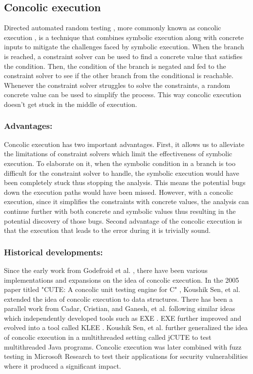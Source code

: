 \documentclass[ runningheads,
               a4paper]{llncs}
\begin{document}
\subsection{Concolic execution}
Directed automated random testing \cite[DART]{godefroid2005dart}, more commonly known as concolic execution \cite{sen2007concolic}, is a technique that combines symbolic execution along with concrete inputs to mitigate the challenges faced by symbolic execution. When the branch is reached, a constraint solver can be used to find a concrete value that satisfies the condition. Then, the condition of the branch is negated and fed to the constraint solver to see if the other branch from the conditional is reachable. Whenever the constraint solver struggles to solve the constraints, a random concrete value can be used to simplify the process. This way concolic execution doesn't get stuck in the middle of execution.


\subsubsection{Advantages:}
Concolic execution has two important advantages. First, it allows us to alleviate the limitations of constraint solvers which limit the effectiveness of symbolic execution. To elaborate on it, when the symbolic condition in a branch is too difficult for the constraint solver to handle, the symbolic execution would have been completely stuck thus stopping the analysis. This means the potential bugs down the execution paths would have been missed. However, with a concolic execution, since it simplifies the constraints with concrete values, the analysis can continue further with both concrete and symbolic values thus resulting in the potential discovery of those bugs. Second advantage of the concolic execution is that the execution that leads to the error during it is trivially sound.


\subsubsection{Historical developments:}
Since the early work from Godefroid et al. \cite{godefroid2005dart}, there have been various implementations and expansions on the idea of concolic execution. In the 2005 paper titled "CUTE: A concolic unit testing engine for C" \cite{sen2005cute}, Koushik Sen, et al. extended the idea of concolic execution to data structures. There has been a parallel work from Cadar, Cristian, and Ganesh, et al. following similar ideas which independently developed tools such as EXE \cite{cadar2008exe}. EXE further improved and evolved into a tool called KLEE \cite{cadar2008klee}.  Koushik Sen, et al. further generalized the idea of concolic execution in a multithreaded setting called jCUTE \cite{sen2006cute} to test multithreaded Java programs. Concolic execution was later combined with fuzz testing \cite{godefroid2008automated} in Microsoft Research \cite[SAGE]{godefroid2012sage} to test their applications for security vulnerabilities where it produced a significant impact.
\end{document}
